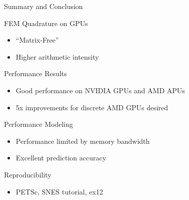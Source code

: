 

%
%










%
%
\begin{frame}{Summary and Conclusion}

 \begin{block}{FEM Quadrature on GPUs}
  \begin{itemize}
   \item ``Matrix-Free''
   \item Higher arithmetic intensity
  \end{itemize}
 \end{block}

 \begin{block}{Performance Results}
  \begin{itemize}
   \item Good performance on NVIDIA GPUs and AMD APUs
   \item 5x improvements for discrete AMD GPUs desired
  \end{itemize}
 \end{block}

 \begin{block}{Performance Modeling}
  \begin{itemize}
   \item Performance limited by memory bandwidth
   \item Excellent prediction accuracy
  \end{itemize}
 \end{block}

  \begin{block}{Reproducibility}
  \begin{itemize}
   \item PETSc, SNES tutorial, ex12
  \end{itemize}
 \end{block}


\end{frame}

